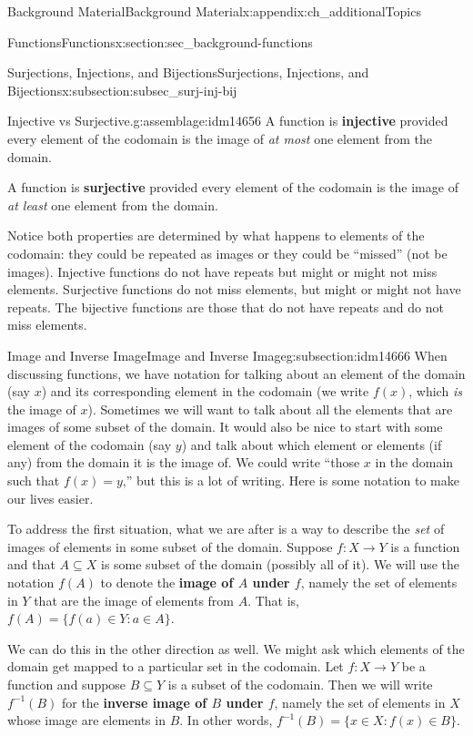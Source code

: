\documentclass[oneside,10pt,]{book}
\newcommand{\terminology}[1]{\textbf{#1}}
\numberwithin{equation}{chapter}
\def\inv{^{-1}}
\def\st{:}
\begin{document}
\begin{appendixptx}{Background Material}{}{Background Material}{}{}{x:appendix:ch_additionalTopics}
\begin{sectionptx}{Functions}{}{Functions}{}{}{x:section:sec_background-functions}
\begin{subsectionptx}{Surjections, Injections, and Bijections}{}{Surjections, Injections, and Bijections}{}{}{x:subsection:subsec_surj-inj-bij}
\begin{assemblage}{Injective vs Surjective.}{g:assemblage:idm14656}
A function is \terminology{injective} provided every element of the codomain is the image of \emph{at most} one element from the domain.%
\par
A function is \terminology{surjective} provided every element of the codomain is the image of \emph{at least} one element from the domain.%
\end{assemblage}
Notice both properties are determined by what happens to elements of the codomain: they could be repeated as images or they could be ``missed'' (not be images).  Injective functions do not have repeats but might or might not miss elements.  Surjective functions do not miss elements, but might or might not have repeats.  The bijective functions are those that do not have repeats and do not miss elements.%
\end{subsectionptx}
%
%
\typeout{************************************************}
\typeout{************************************************}
%
\begin{subsectionptx}{Image and Inverse Image}{}{Image and Inverse Image}{}{}{g:subsection:idm14666}
When discussing functions, we have notation for talking about an element of the domain (say \(x\)) and its corresponding element in the codomain (we write \(f(x)\), which \emph{is} the image of \(x\)). Sometimes we will want to talk about all the elements that are images of some subset of the domain.  It would also be nice to start with some element of the codomain (say \(y\)) and talk about which element or elements (if any) from the domain it is the image of. We could write ``those \(x\) in the domain such that \(f(x) = y\),'' but this is a lot of writing. Here is some notation to make our lives easier.%
\par
To address the first situation, what we are after is a way to describe the \emph{set} of images of elements in some subset of the domain.  Suppose \(f:X \to Y\) is a function and that \(A \subseteq X\) is some subset of the domain (possibly all of it).  We will use the notation \(f(A)\) to denote the \terminology{image of \(A\) under \(f\)}, namely the set of elements in \(Y\) that are the image of elements from \(A\).  That is, \(f(A) = \{f(a) \in Y \st a \in A\}\). \label{g:notation:idm14688}%
\par
We can do this in the other direction as well.  We might ask which elements of the domain get mapped to a particular set in the codomain.  Let \(f:X \to Y\) be a function and suppose \(B \subseteq Y\) is a subset of the codomain.  Then we will write \(f\inv(B)\) for the \terminology{inverse image of \(B\) under \(f\)}, namely the set of elements in \(X\) whose image are elements in \(B\).  In other words, \(f\inv(B) = \{x \in X \st f(x) \in B\}\). \label{g:notation:idm14703}%

\end{subsectionptx}
\end{sectionptx}
\end{appendixptx}
\end{document}
